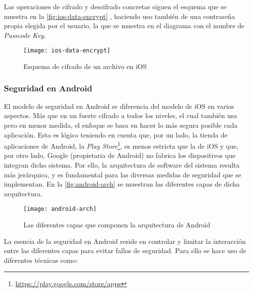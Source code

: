 Las operaciones de cifrado y descifrado concretas siguen el esquema que se muestra en la \autoref{fig:ios-data-encrypt} , haciendo uso también de una contraseña propia elegida por el usuario, la que se muestra en el diagrama con el nombre de \textit{Passcode Key}.

\begin{figure}[H]
	\centering
	\texttt{[image: ios-data-encrypt]}
	\caption{Esquema de cifrado de un archivo en iOS}
	\label{fig:ios-data-encrypt}
\end{figure}

\subsubsection{Seguridad en Android}

El modelo de seguridad en Android se diferencia del modelo de iOS en varios aspectos. Más que en un fuerte cifrado a todos los niveles, el cual también usa pero en menor medida, el enfoque se basa en hacer lo más segura posible cada aplicación. Esto es lógico teniendo en cuenta que, por un lado, la tienda de aplicaciones de Android, la \textit{Play Store}\footnote{\url{https://play.google.com/store/apps}}, es menos estricta que la de iOS y que, por otro lado, Google (propietaria de Android) no fabrica los dispositivos que integran dicho sistema. Por ello, la arquitectura de software del sistema resulta más jerárquica, y es fundamental para las diversas medidas de seguridad que se implementan. En la \autoref{fig:android-arch} se muestran las diferentes capas de dicha arquitectura. 

\begin{figure}[H]
	\centering
	\texttt{[image: android-arch]}
	\caption{Las diferentes capas que componen la arquitectura de Android}
	\label{fig:android-arch}
\end{figure}

La esencia de la seguridad en Android reside en controlar y limitar la interacción entre las diferentes capas para evitar fallos de seguridad. Para ello se hace uso de diferentes técnicas \cite{android-sec-guide} \cite{jspdcp-2014} como:

